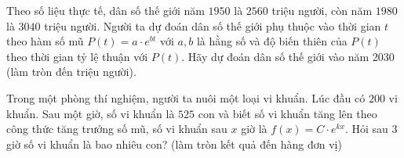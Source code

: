 \begin{bt}%

    Theo số liệu thực tế, dân số thế giới năm $1950$ là $2560$ triệu người, còn năm $1980$ là $3040$ triệu người. Người ta dự đoán dân số thế giới phụ thuộc vào thời gian $t$ theo hàm số mũ $P\left( t \right) = a\cdot{e^{bt}}$ với $a, b$  là hằng số và độ biến thiên của $P(t)$ theo thời gian tỷ lệ thuận với $P\left( t \right)$. Hãy dự đoán dân số thế giới vào năm 2030 (làm tròn đến triệu người).
\end{bt}

\begin{bt}%
	Trong một phòng thí nghiệm, người ta nuôi một loại vi khuẩn. Lúc đầu có $200$ vi khuẩn. Sau một giờ, số vi khuẩn là $525$ con và biết số vi khuẩn tăng lên theo công thức tăng trưởng số mũ, số vi khuẩn sau $x$ giờ là $f(x)=C\cdot e^{kx}$. Hỏi sau $3$ giờ số vi khuẩn là bao nhiêu con? (làm tròn kết quả đến hàng đơn vị)
\end{bt}


